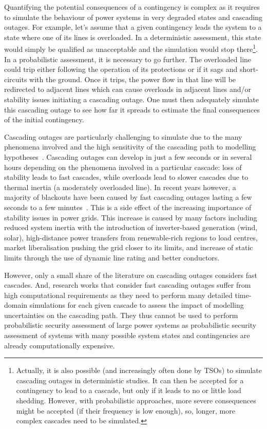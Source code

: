Quantifying the potential consequences of a contingency is complex as it requires to simulate the behaviour of power systems in very degraded states and cascading outages. For example, let's assume that a given contingency leads the system to a state where one of its lines is overloaded. In a deterministic assessment, this state would simply be qualified as unacceptable and the simulation would stop there\footnote{Actually, it is also possible (and increasingly often done by TSOs) to simulate cascading outages in deterministic studies. It can then be accepted for a contingency to lead to a cascade, but only if it leads to no or little load shedding. However, with probabilistic approaches, more severe consequences might be accepted (if their frequency is low enough), so, longer, more complex cascades need to be simulated.}. In a probabilistic assessment, it is necessary to go further. The overloaded line could trip either following the operation of its protections or if it sags and short-circuits with the ground. Once it trips, the power flow in that line will be redirected to adjacent lines which can cause overloads in adjacent lines and/or stability issues initiating a cascading outage. One must then adequately simulate this cascading outage to see how far it spreads to estimate the final consequences of the initial contingency.

Cascading outages are particularly challenging to simulate due to the many phenomena involved and the high sensitivity of the cascading path to modelling hypotheses~\cite{CascadingMethodoAndChallenges}. Cascading outages can develop in just a few seconds or in several hours depending on the phenomena involved in a particular cascade: loss of stability leads to fast cascades, while overloads lead to slower cascades due to thermal inertia (\eg a moderately overloaded line). In recent years however, a majority of blackouts have been caused by fast cascading outages lasting a few seconds to a few minutes~\cite{cascadeAcceleration}. This is a side effect of the increasing importance of stability issues in power grids. This increase is caused by many factors including reduced system inertia with the introduction of inverter-based generation (wind, solar), high-distance power transfers from renewable-rich regions to load centres, market liberalisation pushing the grid closer to its limits, and increase of static limits through the use of dynamic line rating and better conductors.

However, only a small share of the literature on cascading outages considers fast cascades. And, research works that consider fast cascading outages suffer from high computational requirements as they need to perform many detailed time-domain simulations for each given cascade to assess the impact of modelling uncertainties on the cascading path. They thus cannot be used to perform probabilistic security assessment of large power systems as probabilistic security assessment of systems with many possible system states and contingencies are already computationally expensive.


